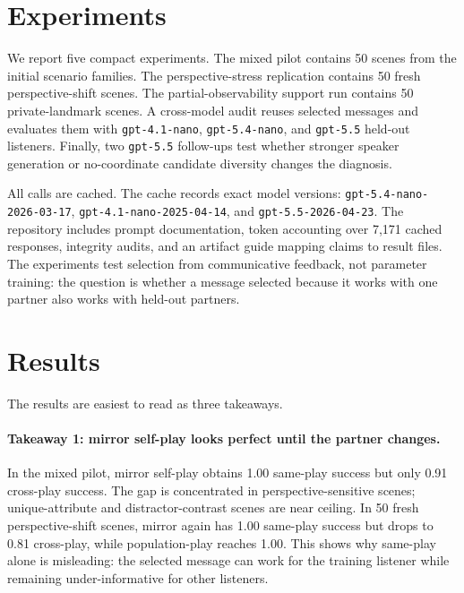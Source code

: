 \documentclass{article}
\begin{document}
\section{Experiments}

We report five compact experiments. The mixed pilot contains 50 scenes from the initial scenario families. The perspective-stress replication contains 50 fresh perspective-shift scenes. The partial-observability support run contains 50 private-landmark scenes. A cross-model audit reuses selected messages and evaluates them with \texttt{gpt-4.1-nano}, \texttt{gpt-5.4-nano}, and \texttt{gpt-5.5} held-out listeners. Finally, two \texttt{gpt-5.5} follow-ups test whether stronger speaker generation or no-coordinate candidate diversity changes the diagnosis.

All calls are cached. The cache records exact model versions: {\footnotesize\texttt{gpt-5.4-nano-2026-03-17}}, {\footnotesize\texttt{gpt-4.1-nano-2025-04-14}}, and {\footnotesize\texttt{gpt-5.5-2026-04-23}}. The repository includes prompt documentation, token accounting over 7,171 cached responses, integrity audits, and an artifact guide mapping claims to result files. The experiments test selection from communicative feedback, not parameter training: the question is whether a message selected because it works with one partner also works with held-out partners.

\section{Results}

The results are easiest to read as three takeaways.

\paragraph{Takeaway 1: mirror self-play looks perfect until the partner changes.}
In the mixed pilot, mirror self-play obtains 1.00 same-play success but only 0.91 cross-play success. The gap is concentrated in perspective-sensitive scenes; unique-attribute and distractor-contrast scenes are near ceiling. In 50 fresh perspective-shift scenes, mirror again has 1.00 same-play success but drops to 0.81 cross-play, while population-play reaches 1.00. This shows why same-play alone is misleading: the selected message can work for the training listener while remaining under-informative for other listeners.
\end{document}
